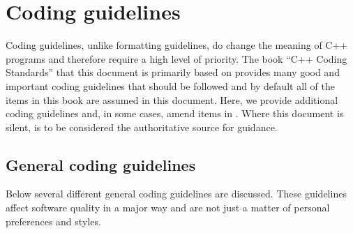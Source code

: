 %
\section{Coding guidelines}
\label{thyracodingguidelines:codingguidelines:sec}
%

Coding guidelines, unlike formatting guidelines, do change the meaning of C++
programs and therefore require a high level of priority.  The book ``C++
Coding Standards'' {}\cite{C++CodingStandards05} that this document is
primarily based on provides many good and important coding guidelines that
should be followed and by default all of the items in this book are assumed in
this document.  Here, we provide additional coding guidelines and, in some
cases, amend items in {}\cite{C++CodingStandards05}.  Where this document is
silent, {}\cite{C++CodingStandards05} is to be considered the authoritative
source for guidance.

%
\subsection{General coding guidelines}
%

Below several different general coding guidelines are discussed.  These
guidelines affect software quality in a major way and are not just a matter of
personal preferences and styles.

